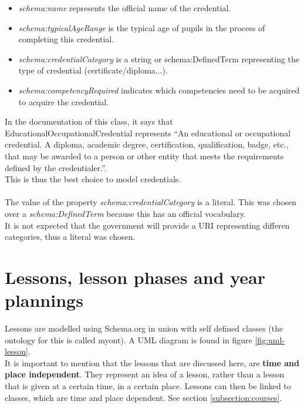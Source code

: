 \documentclass[a4paper]{report}
\begin{document}
    \begin{itemize}
        \item \emph{schema:name} represents the official name of the credential.
        \item \emph{schema:typicalAgeRange} is the typical age of pupils in the process of completing this credential.
        \item \emph{schema:credentialCategory} is a string or schema:DefinedTerm representing the type of credential (certificate/diploma...).
        \item \emph{schema:competencyRequired} indicates which competencies need to be acquired to acquire the credential.
    \end{itemize}
    In the documentation of this class, it says that EducationalOccupationalCredential represents ``An educational or occupational credential. A diploma, academic degree, certification, qualification, badge, etc., that may be awarded to a person or other entity that meets the requirements defined by the credentialer.''.\\
    This is thus the best choice to model credentials.\\ \\
    The value of the property \textit{schema:credentialCategory} is a literal. This was chosen over a \textit{schema:DefinedTerm} because this has an official vocabulary.\\
    It is not expected that the government will provide a URI representing differen categories, thus a literal was chosen.

    \section{Lessons, lesson phases and year plannings}
    \label{subsection:yearplans}

    Lessons are modelled using Schema.org in union with self defined classes (the ontology for this is called myont). A UML diagram is found in figure \ref{fig:uml-lesson}.\\
    It is important to mention that the lessons that are discussed here, are \textbf{time and place independent}. They represent an idea of a lesson, rather than a lesson that is given at a certain time, in a certain place.
    Lessons can then be linked to classes, which are time and place dependent. See section \ref{subsection:courses}.\\
\end{document}
